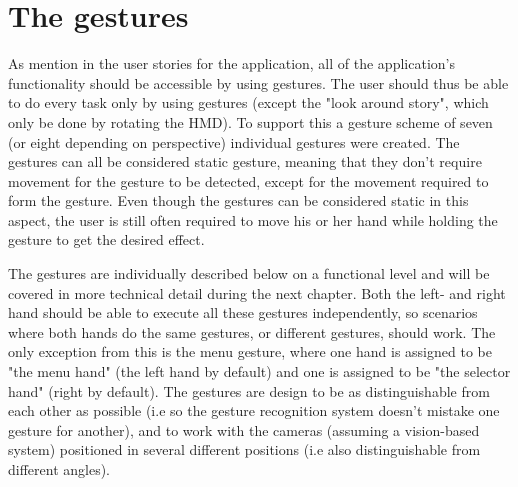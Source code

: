 \section{The gestures}
As mention in the user stories for the application, all of the application's functionality should be accessible by using gestures. The user should thus
be able to do every task only by using gestures (except the "look around story", which only be done by rotating the HMD). To support this a gesture scheme of seven (or eight depending
on perspective) individual gestures were created. The gestures can all be considered static gesture, meaning that they don't require movement for the gesture to be detected, 
except for the movement required to form the gesture. 
Even though the gestures can be considered static in this aspect, the user is still often required to move his or her hand while holding the gesture to get the desired effect. 

The gestures are individually described below on a functional level and will be covered in more technical detail during the next chapter. 
Both the left- and right hand should be able to execute all these gestures independently, so scenarios where both hands do the same gestures, or different gestures, should
work. The only exception from this is the menu gesture, where one hand is assigned to be "the menu hand" (the left hand by default) and one is assigned to be "the selector hand"
(right by default). The gestures are design to be as distinguishable from each other as possible (i.e so the gesture recognition system doesn't mistake one gesture for
another), and to work with the cameras (assuming a vision-based system) positioned in several different positions (i.e also distinguishable from different angles).

 
